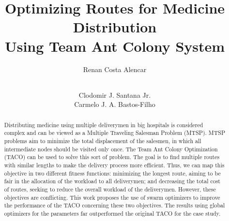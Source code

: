 \documentclass[runningheads]{llncs}
\begin{document}
%
\title{Optimizing Routes for Medicine Distribution \\Using Team Ant Colony System}
%
%
\author{Renan Costa Alencar \and \\
Clodomir J. Santana Jr.
\\
Carmelo J. A. Bastos-Filho}
%
%


%
\maketitle              %
%
\begin{abstract}
Distributing medicine using multiple deliverymen in big hospitals is considered complex and can be viewed as a Multiple Traveling Salesman Problem (MTSP). MTSP problems aim to minimize the total displacement of the salesmen, in which all intermediate nodes should be visited only once. The Team Ant Colony Optimization (TACO) can be used to solve this sort of problem. The goal is to find multiple routes with similar lengths to make the delivery process more efficient. Thus, we can map this objective in two different fitness functions: minimizing the longest route, aiming to be fair in the allocation of the workload to all deliverymen; and decreasing the total cost of routes, seeking to reduce the overall workload of the deliverymen. However, these objectives are conflicting. This work proposes the use of swarm optimizers to improve the performance of the TACO concerning these two objectives. The results using global optimizers for the parameters far outperformed the original TACO for the case study.

\end{abstract}
%
%
%
\end{document}
